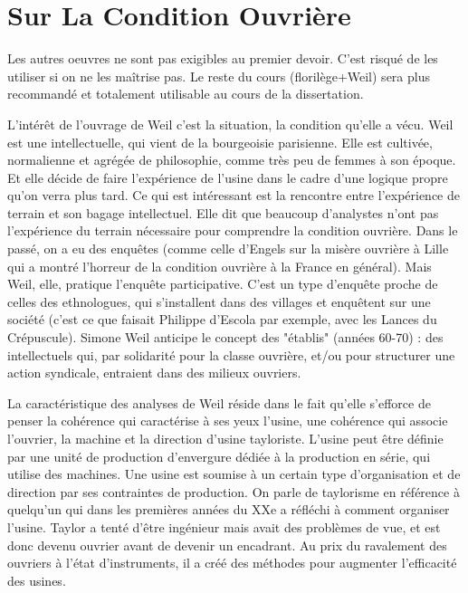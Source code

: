 \documentclass[a4paper,12pt]{book}
\begin{document}
\chapter{Sur La Condition Ouvrière}
Les autres oeuvres ne sont pas exigibles au premier devoir. C'est risqué de les utiliser si on ne les maîtrise pas. Le reste du cours (florilège+Weil) sera plus recommandé et totalement utilisable au cours de la dissertation.
\par L'intérêt de l'ouvrage de Weil c'est la situation, la condition qu'elle a vécu. Weil est une intellectuelle, qui vient de la bourgeoisie parisienne. Elle est cultivée, normalienne et agrégée de philosophie, comme très peu de femmes à son époque. Et elle décide de faire l'expérience de l'usine dans le cadre d'une logique propre qu'on verra plus tard. Ce qui est intéressant est la rencontre entre l'expérience de terrain et son bagage intellectuel. Elle dit que beaucoup d'analystes n'ont pas l'expérience du terrain nécessaire pour comprendre la condition ouvrière. Dans le passé, on a eu des enquêtes (comme celle d'Engels sur la misère ouvrière à Lille qui a montré l'horreur de la condition ouvrière à la France en général). Mais Weil, elle, pratique l'enquête participative. C'est un type d'enquête proche de celles des ethnologues, qui s'installent dans des villages et enquêtent sur une société (c'est ce que faisait Philippe d'Escola par exemple, avec les Lances du Crépuscule). Simone Weil anticipe le concept des "établis" (années 60-70) : des intellectuels qui, par solidarité pour la classe ouvrière, et/ou pour structurer une action syndicale, entraient dans des milieux ouvriers.
\par La caractéristique des analyses de Weil réside dans le fait qu'elle s'efforce de penser la cohérence qui caractérise à ses yeux l'usine, une cohérence qui associe l'ouvrier, la machine et la direction d'usine tayloriste. L'usine peut être définie par une unité de production d'envergure dédiée à la production en série, qui utilise des machines. Une usine est soumise à un certain type d'organisation et de direction par ses contraintes de production. On parle de taylorisme en référence à quelqu'un qui dans les premières années du XXe a réfléchi à comment organiser l'usine. Taylor a tenté d'être ingénieur mais avait des problèmes de vue, et est donc devenu ouvrier avant de devenir un encadrant. Au prix du ravalement des ouvriers à l'état d'instruments, il a créé des méthodes pour augmenter l'efficacité des usines.
\end{document}
